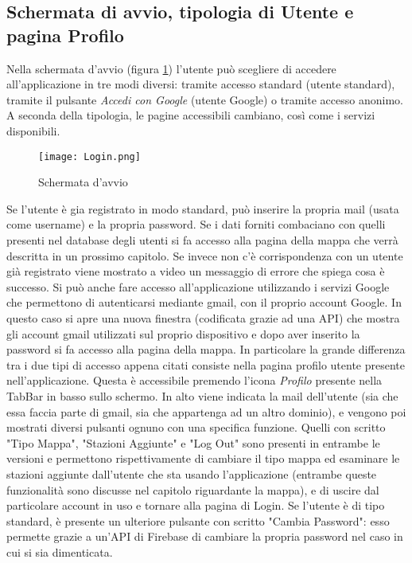 \subsection{Schermata di avvio, tipologia di Utente e pagina Profilo}
Nella schermata d'avvio (figura \ref{login}) l'utente può scegliere di accedere
all'applicazione in tre modi diversi: tramite accesso standard (utente
standard), tramite il pulsante \textit{Accedi con Google} (utente Google) o
tramite accesso anonimo. A seconda della tipologia, le pagine accessibili
cambiano, così come i servizi disponibili.
\begin{figure}[h!]
    \centering
    \texttt{[image: Login.png]}
    \caption{Schermata d'avvio}
    \label{login}
\end{figure}
Se l'utente è gia registrato in modo standard, può inserire la propria mail
(usata come username) e la propria password. Se i dati forniti combaciano con
quelli presenti nel database degli utenti si fa accesso alla pagina della mappa
che verrà descritta in un prossimo capitolo. Se invece non c'è corrispondenza
con un utente già registrato viene mostrato a video un messaggio di errore che
spiega cosa è successo. \newline
Si può anche fare accesso all'applicazione utilizzando i servizi Google che
permettono di autenticarsi mediante gmail, con il proprio
account Google. In questo caso si apre una nuova finestra (codificata grazie ad
una API) che mostra gli account gmail utilizzati sul proprio dispositivo e dopo
aver inserito la password si fa accesso alla pagina della mappa. In particolare
la grande differenza tra i due tipi di accesso appena citati consiste nella
pagina profilo utente presente nell'applicazione. Questa è accessibile premendo
l'icona \textit{Profilo} presente nella TabBar in basso sullo schermo. In alto
viene indicata la mail dell'utente (sia che essa faccia parte di gmail, sia che appartenga
ad un altro dominio), e vengono poi mostrati diversi pulsanti ognuno con una
specifica funzione. Quelli con scritto "Tipo Mappa", "Stazioni Aggiunte" e "Log
Out" sono presenti in entrambe le versioni e permettono rispettivamente di
cambiare il tipo mappa ed esaminare le stazioni aggiunte dall'utente che sta
usando l'applicazione (entrambe queste funzionalità sono discusse nel capitolo
riguardante la mappa), e di uscire dal particolare account in uso e tornare alla
pagina di Login. Se l'utente è di tipo standard, è presente un ulteriore
pulsante con scritto "Cambia Password": esso permette grazie a un'API di
Firebase di cambiare la propria password nel caso in cui si sia dimenticata.

